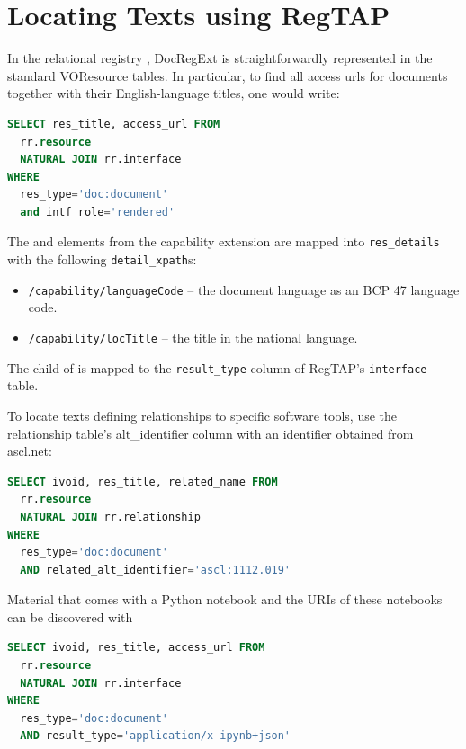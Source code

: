 \documentclass{ivoa}
\begin{document}


\section{Locating Texts using RegTAP}
\label{sect:docregext-regtap}

In the relational registry \citep{2019ivoa.spec.1011D}, DocRegExt is
straightforwardly represented in the standard VOResource tables.  In
particular, to find all access urls for documents together with their
English-language titles, one would write:

\begin{lstlisting}[language=SQL]
SELECT res_title, access_url FROM
  rr.resource
  NATURAL JOIN rr.interface
WHERE
  res_type='doc:document'
  and intf_role='rendered'
\end{lstlisting}

The  and  elements from the
 capability extension are mapped into
\verb|res_details| with the following \verb|detail_xpath|s:

\begin{itemize}

\item \texttt{/capability/languageCode} -- the document language as an
BCP 47 \citep{std:BCP47} language code.
\item \texttt{/capability/locTitle} -- the title in the national
language.
\end{itemize}

The  child of  is mapped to
the \verb|result_type| column of RegTAP's \verb|interface| table.

To locate texts defining relationships to specific software tools, use
the relationship table's alt\_identifier column with an identifier
obtained from ascl.net:

\begin{lstlisting}[language=SQL]
SELECT ivoid, res_title, related_name FROM
  rr.resource
  NATURAL JOIN rr.relationship
WHERE
  res_type='doc:document'
  AND related_alt_identifier='ascl:1112.019'
\end{lstlisting}

Material that comes with a Python notebook and the URIs of these
notebooks can be discovered with

\begin{lstlisting}[language=SQL]
SELECT ivoid, res_title, access_url FROM
  rr.resource
  NATURAL JOIN rr.interface
WHERE
  res_type='doc:document'
  AND result_type='application/x-ipynb+json'
\end{lstlisting}
\end{document}
